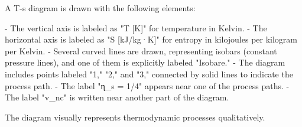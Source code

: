 A T-s diagram is drawn with the following elements:  

- The vertical axis is labeled as "T [K]" for temperature in Kelvin.  
- The horizontal axis is labeled as "S [kJ/kg·K]" for entropy in kilojoules per kilogram per Kelvin.  
- Several curved lines are drawn, representing isobars (constant pressure lines), and one of them is explicitly labeled "Isobare."  
- The diagram includes points labeled "1," "2," and "3," connected by solid lines to indicate the process path.  
- The label "η_s = 1/4" appears near one of the process paths.  
- The label "v_nc" is written near another part of the diagram.  

The diagram visually represents thermodynamic processes qualitatively.